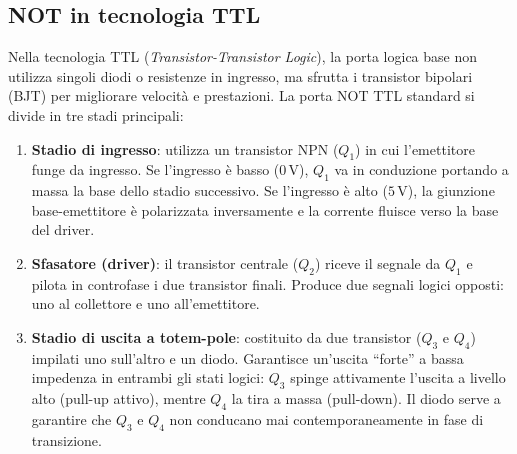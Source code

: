 \documentclass[11pt,a4paper]{report}
\begin{document}
\subsection{NOT in tecnologia TTL}

Nella tecnologia TTL (\emph{Transistor-Transistor Logic}), la porta logica base non utilizza singoli diodi o resistenze in ingresso, ma sfrutta i transistor bipolari (BJT) per migliorare velocità e prestazioni. La porta NOT TTL standard si divide in tre stadi principali:

\begin{enumerate}[leftmargin=1.5em]
    \item \textbf{Stadio di ingresso}: utilizza un transistor NPN ($Q_1$) in cui l'emettitore funge da ingresso. Se l'ingresso è basso ($0\,\mathrm{V}$), $Q_1$ va in conduzione portando a massa la base dello stadio successivo. Se l'ingresso è alto ($5\,\mathrm{V}$), la giunzione base-emettitore è polarizzata inversamente e la corrente fluisce verso la base del driver.
    \item \textbf{Sfasatore (driver)}: il transistor centrale ($Q_2$) riceve il segnale da $Q_1$ e pilota in controfase i due transistor finali. Produce due segnali logici opposti: uno al collettore e uno all'emettitore.
    \item \textbf{Stadio di uscita a totem-pole}: costituito da due transistor ($Q_3$ e $Q_4$) impilati uno sull'altro e un diodo. Garantisce un'uscita ``forte'' a bassa impedenza in entrambi gli stati logici: $Q_3$ spinge attivamente l'uscita a livello alto (pull-up attivo), mentre $Q_4$ la tira a massa (pull-down). Il diodo serve a garantire che $Q_3$ e $Q_4$ non conducano mai contemporaneamente in fase di transizione.
\end{enumerate}
\end{document}
